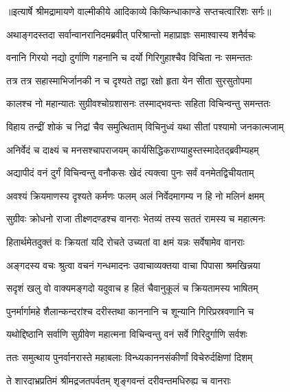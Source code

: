 {॥इत्यार्षे श्रीमद्रामायणे वाल्मीकीये आदिकाव्ये किष्किन्धाकाण्डे सप्तचत्वारिंशः सर्गः॥}


\twolineshloka
{अथाङ्गदस्तदा सर्वान्वानरानिदमब्रवीत्}
{परिश्रान्तो महाप्राज्ञः समाश्वास्य शनैर्वचः} %

\twolineshloka
{वनानि गिरयो नद्यो दुर्गाणि गहनानि च}
{दर्यो गिरिगुहाश्चैव विचिता नः समन्ततः} %

\twolineshloka
{तत्र तत्र सहास्माभिर्जानकी न च दृश्यते}
{तद्वा रक्षो हृता येन सीता सुरसुतोपमा} %

\twolineshloka
{कालश्च नो महान्यातः सुग्रीवश्चोग्रशासनः}
{तस्माद्भवन्तः सहिता विचिन्वन्तु समन्ततः} %

\twolineshloka
{विहाय तन्द्रीं शोकं च निद्रां चैव समुत्थिताम्}
{विचिनुध्वं यथा सीतां पश्यामो जनकात्मजाम्} %

\twolineshloka
{अनिर्वेदं च दाक्ष्यं च मनसश्चापराजयम्}
{कार्यसिद्धिकराण्याहुस्तस्मादेतद्ब्रवीम्यहम्} %

\twolineshloka
{अद्यापीदं वनं दुर्गं विचिन्वन्तु वनौकसः}
{खेदं त्यक्त्वा पुनः सर्वं वनमेतद्विचीयताम्} %

\twolineshloka
{अवश्यं क्रियमाणस्य दृश्यते कर्मणः फलम्}
{अलं निर्वेदमागम्य न हि नो मलिनं क्षमम्} %

\twolineshloka
{सुग्रीवः क्रोधनो राजा तीक्ष्णदण्डश्च वानराः}
{भेतव्यं तस्य सततं रामस्य च महात्मनः} %

\twolineshloka
{हितार्थमेतदुक्तं वः क्रियतां यदि रोचते}
{उच्यतां वा क्षमं यन्नः सर्वेषामेव वानराः} %

\twolineshloka
{अङ्गदस्य वचः श्रुत्वा वचनं गन्धमादनः}
{उवाचाव्यक्तया वाचा पिपासा श्रमखिन्नया} %

\twolineshloka
{सदृशं खलु वो वाक्यमङ्गदो यदुवाच ह}
{हितं चैवानुकूलं च क्रियतामस्य भाषितम्} %

\twolineshloka
{पुनर्मार्गामहे शैलान्कन्दरांश्च दरीस्तथा}
{काननानि च शून्यानि गिरिप्रस्रवणानि च} %

\twolineshloka
{यथोद्दिष्ठानि सर्वाणि सुग्रीवेण महात्मना}
{विचिन्वन्तु वनं सर्वे गिरिदुर्गाणि सर्वशः} %

\twolineshloka
{ततः समुत्थाय पुनर्वानरास्ते महाबलाः}
{विन्ध्यकाननसंकीर्णां विचेरुर्दक्षिणां दिशम्} %

\twolineshloka
{ते शारदाभ्रप्रतिमं श्रीमद्रजतपर्वतम्}
{शृङ्गवन्तं दरीवन्तमधिरुह्य च वानराः} %

